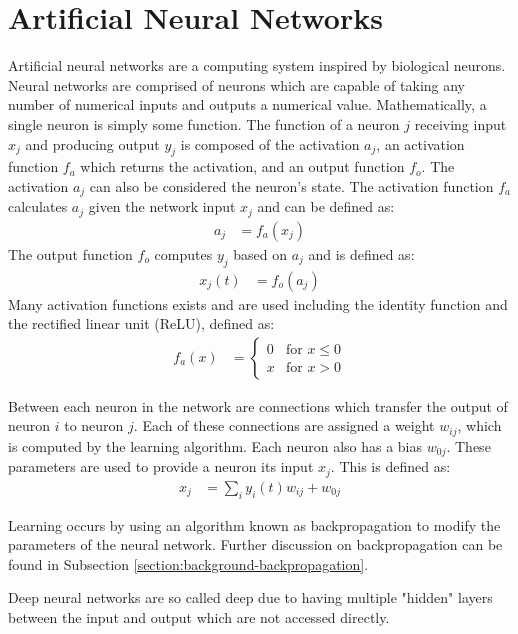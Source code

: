 \section{Artificial Neural Networks}
Artificial neural networks are a computing system inspired by biological neurons. Neural networks are comprised of neurons which are capable of taking any number of numerical inputs and outputs a numerical value. Mathematically, a single neuron is simply some function.
The function of a neuron $j$ receiving input $x_j$ and producing output $y_j$ is composed of the activation $a_j$, an activation function $f_a$ which returns the activation, and an output function $f_{o}$.
The activation $a_j$ can also be considered the neuron's state.
The activation function $f_a$ calculates $a_j$ given the network input $x_j$ and can be defined as:
\begin{align}
	a_j &= f_a\left(x_j\right)
\end{align}
The output function $f_o$ computes $y_j$ based on $a_j$ and is defined as:
\begin{align}
	x_j(t) &= f_o\left(a_j\right)
\end{align}
Many activation functions exists and are used including the identity function and the rectified linear unit (ReLU), defined as:
\begin{align}
	f_a(x) &= 
	\begin{cases}
		0	& \text{for } x \leq 0\\
		x	& \text{for } x > 0
	\end{cases}
\end{align}

Between each neuron in the network are connections which transfer the output of neuron $i$ to neuron $j$. Each of these connections are assigned a weight $w_{ij}$, which is computed by the learning algorithm.
Each neuron also has a bias $w_{0j}$.
These parameters are used to provide a neuron its input $x_j$. This is defined as:
\begin{align}
	x_j &= \sum_{i}y_i(t)w_{ij} + w_{0j}
\end{align}

Learning occurs by using an algorithm known as backpropagation to modify the parameters of the neural network.
Further discussion on backpropagation can be found in Subsection \ref{section:background-backpropagation}.

Deep neural networks are so called deep due to having multiple "hidden" layers between the input and output which are not accessed directly.

